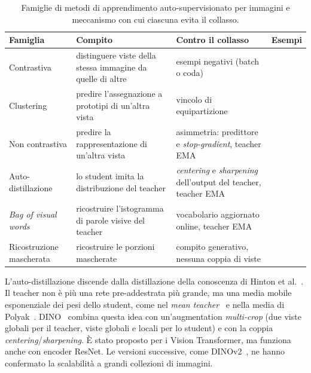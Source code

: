 \begin{table}[t]
  \centering
  \small
  \caption[Famiglie di metodi auto-supervisionati]{Famiglie di metodi di apprendimento
    auto-supervisionato per immagini e meccanismo con cui ciascuna evita il collasso.}
  \label{tab:ssl-famiglie}
  \begin{tabular}{|l|p{3.1cm}|p{3.7cm}|l|}
    \hline
    \textbf{Famiglia} & \textbf{Compito} & \textbf{Contro il collasso} & \textbf{Esempi} \\
    \hline
    Contrastiva & distinguere viste della stessa immagine da quelle di altre &
      esempi negativi (batch o coda) & \cite{chen2020simclr,he2020moco} \\
    \hline
    Clustering & predire l'assegnazione a prototipi di un'altra vista &
      vincolo di equipartizione & \cite{caron2020swav} \\
    \hline
    Non contrastiva & predire la rappresentazione di un'altra vista &
      asimmetria: predittore e \emph{stop-gradient}, teacher EMA & \cite{grill2020byol,chen2021simsiam} \\
    \hline
    Auto-distillazione & lo student imita la distribuzione del teacher &
      \emph{centering} e \emph{sharpening} dell'output del teacher, teacher EMA &
      \cite{caron2021dino,li2022esvit} \\
    \hline
    \emph{Bag of visual words} & ricostruire l'istogramma di parole visive del teacher &
      vocabolario aggiornato online, teacher EMA & \cite{gidaris2021obow} \\
    \hline
    Ricostruzione mascherata & ricostruire le porzioni mascherate &
      compito generativo, nessuna coppia di viste & \cite{he2022mae,cong2022satmae} \\
    \hline
  \end{tabular}
\end{table}

L'auto-distillazione discende dalla distillazione della conoscenza di Hinton et
al.~\cite{hinton2015distilling,gou2021kdsurvey}. Il teacher non è più una rete pre-addestrata
più grande, ma una media mobile esponenziale dei pesi dello student, come nel \emph{mean
teacher}~\cite{tarvainen2017meanteacher} e nella media di Polyak~\cite{polyak1992averaging}.
DINO~\cite{caron2021dino} combina questa idea con un'augmentation \emph{multi-crop} (due viste
globali per il teacher, viste globali e locali per lo student) e con la coppia
\emph{centering}/\emph{sharpening}. È stato proposto per i Vision Transformer, ma funziona anche
con encoder ResNet. Le versioni successive, come DINOv2~\cite{oquab2024dinov2}, ne hanno
confermato la scalabilità a grandi collezioni di immagini.

